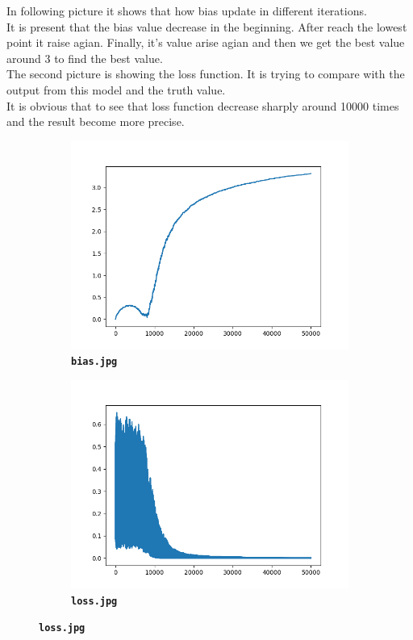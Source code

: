 \documentclass[12pt]{article}
\begin{document}
In following picture it shows that how bias update in different iterations.\\
It is present that the bias value decrease in the beginning. After reach the lowest point it raise agian. Finally, it's value arise agian and then we get the best value around 3 to find the best value.\\
The second picture is showing the loss function. It is trying to compare with the output from this model and the truth value.\\
It is obvious that to see that loss function decrease sharply around 10000 times and the result become more precise.
\begin{figure}[htb]
    \centering
    \begin{subfigure}[b]{.48\linewidth}
    \centering
    \includegraphics[width=\linewidth]{bias.png}
    \caption{\textbf{\texttt{bias.jpg}}}
    \end{subfigure}
    \label{fig:1}
    \begin{subfigure}[b]{.48\linewidth}
    \centering
    \includegraphics[width=\linewidth]{loss.png}
    \caption{\textbf{\texttt{loss.jpg}}}
    \end{subfigure}
    \label{fig:2}
\end{figure}
\end{document}
